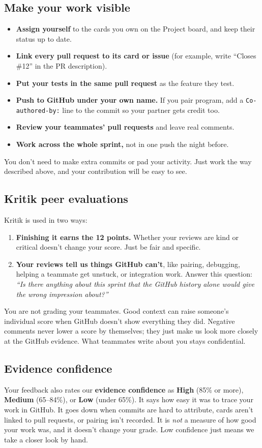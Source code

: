 \documentclass[11pt]{article}
\begin{document}
\subsection*{Make your work visible}
\begin{itemize}
    \item \textbf{Assign yourself} to the cards you own on the Project board, and keep their status up to date.
    \item \textbf{Link every pull request to its card or issue} (for example, write ``Closes \#12'' in the PR description).
    \item \textbf{Put your tests in the same pull request} as the feature they test.
    \item \textbf{Push to GitHub under your own name.} If you pair program, add a \texttt{Co-authored-by:} line to the commit so your partner gets credit too.
    \item \textbf{Review your teammates' pull requests} and leave real comments.
    \item \textbf{Work across the whole sprint,} not in one push the night before.
\end{itemize}
You don't need to make extra commits or pad your activity. Just work the way described above, and your contribution will be easy to see.

\subsection*{Kritik peer evaluations}
Kritik is used in two ways:
\begin{enumerate}
    \item \textbf{Finishing it earns the 12 points.} Whether your reviews are kind or critical doesn't change your score. Just be fair and specific.
    \item \textbf{Your reviews tell us things GitHub can't}, like pairing, debugging, helping a teammate get unstuck, or integration work. Answer this question: \emph{``Is there anything about this sprint that the GitHub history alone would give the wrong impression about?''}
\end{enumerate}
You are not grading your teammates. Good context can raise someone's individual score when GitHub doesn't show everything they did. Negative comments never lower a score by themselves; they just make us look more closely at the GitHub evidence. What teammates write about you stays confidential.

\subsection*{Evidence confidence}
Your feedback also rates our \textbf{evidence confidence} as \textbf{High} (85\% or more), \textbf{Medium} (65--84\%), or \textbf{Low} (under 65\%). It says how easy it was to trace your work in GitHub. It goes down when commits are hard to attribute, cards aren't linked to pull requests, or pairing isn't recorded. It is \emph{not} a measure of how good your work was, and it doesn't change your grade. Low confidence just means we take a closer look by hand.
\end{document}
